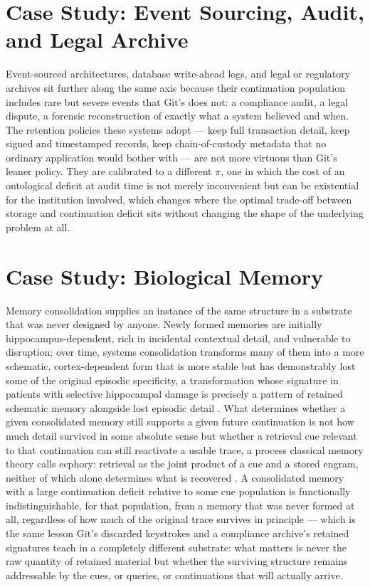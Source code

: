 \documentclass[11pt]{article}
\begin{document}
\section{Case Study: Event Sourcing, Audit, and Legal Archive}

Event-sourced architectures, database write-ahead logs, and legal or regulatory archives sit further along the same axis because their continuation population includes rare but severe events that Git's does not: a compliance audit, a legal dispute, a forensic reconstruction of exactly what a system believed and when. The retention policies these systems adopt --- keep full transaction detail, keep signed and timestamped records, keep chain-of-custody metadata that no ordinary application would bother with --- are not more virtuous than Git's leaner policy. They are calibrated to a different $\pi$, one in which the cost of an ontological deficit at audit time is not merely inconvenient but can be existential for the institution involved, which changes where the optimal trade-off between storage and continuation deficit sits without changing the shape of the underlying problem at all.

\section{Case Study: Biological Memory}

Memory consolidation supplies an instance of the same structure in a substrate that was never designed by anyone. Newly formed memories are initially hippocampus-dependent, rich in incidental contextual detail, and vulnerable to disruption; over time, systems consolidation transforms many of them into a more schematic, cortex-dependent form that is more stable but has demonstrably lost some of the original episodic specificity, a transformation whose signature in patients with selective hippocampal damage is precisely a pattern of retained schematic memory alongside lost episodic detail \cite{squirealvarez1995}. What determines whether a given consolidated memory still supports a given future continuation is not how much detail survived in some absolute sense but whether a retrieval cue relevant to that continuation can still reactivate a usable trace, a process classical memory theory calls ecphory: retrieval as the joint product of a cue and a stored engram, neither of which alone determines what is recovered \cite{tulving1983}. A consolidated memory with a large continuation deficit relative to some cue population is functionally indistinguishable, for that population, from a memory that was never formed at all, regardless of how much of the original trace survives in principle --- which is the same lesson Git's discarded keystrokes and a compliance archive's retained signatures teach in a completely different substrate: what matters is never the raw quantity of retained material but whether the surviving structure remains addressable by the cues, or queries, or continuations that will actually arrive.
\end{document}
